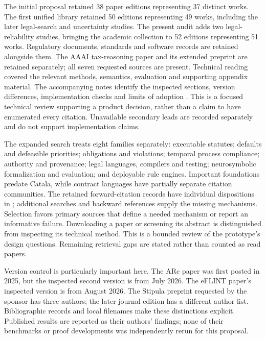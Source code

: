 The initial proposal retained 38 paper editions representing 37 distinct
works. The first unified library retained 50 editions representing 49 works,
including the later legal-search and uncertainty studies. The present
audit adds two legal-reliability studies, bringing the academic collection
to 52 editions representing 51 works. Regulatory documents, standards
and software records are retained alongside them.
The AAAI tax-reasoning paper and its extended preprint are retained separately;
all seven requested sources are present. Technical reading covered the relevant
methods, semantics, evaluation and supporting appendix material. The accompanying
notes identify the inspected sections, version differences, implementation checks
and limits of adoption \citep{libraryreview}. This is a focused technical review
supporting a product decision, rather than a claim to have enumerated every
citation. Unavailable secondary leads are recorded separately and do not support
implementation claims.


The expanded search treats eight families separately: executable statutes;
defaults and defeasible priorities; obligations and violations; temporal process
compliance; authority and provenance; legal languages, compilers and testing;
neurosymbolic formalization and evaluation; and deployable rule engines. Important
foundations predate Catala, while contract languages have partially separate
citation communities. The retained forward-citation records have individual
dispositions in ; additional searches and backward
references supply the missing mechanisms. Selection favors primary sources that
define a needed mechanism or report an informative failure. Downloading a paper
or screening its abstract is distinguished from inspecting its technical method.
This is a bounded review of the prototype's design questions. Remaining retrieval
gaps are stated rather than counted as read papers.

Version control is particularly important here. The ARc paper was first posted
in 2025, but the inspected second version is from July 2026. The eFLINT paper's
inspected version is from August 2026. The Stipula preprint requested by the
sponsor has three authors; the later journal edition has a different author list.
Bibliographic records and local filenames make these distinctions explicit.
Published results are reported as their authors' findings; none of their
benchmarks or proof developments was independently rerun for this proposal.

